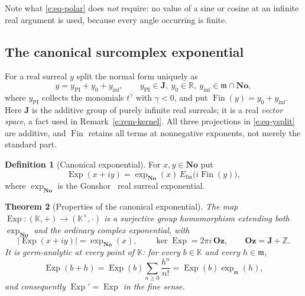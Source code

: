 \documentclass[11pt,a4paper]{article}
\numberwithin{equation}{section}
\newtheorem{theorem}{Theorem}[section]
\theoremstyle{definition}
\newtheorem{definition}[theorem]{Definition}
\theoremstyle{remark}
\theoremstyle{plain}
\newcommand{\K}{\mathbb K}
\newcommand{\No}{\mathbf{No}}
\newcommand{\Oz}{\mathbf{Oz}}
\newcommand{\Jpi}{\mathbf J}
\newcommand{\RR}{\mathbb R}
\newcommand{\ZZ}{\mathbb Z}
\newcommand{\mm}{\mathfrak m}
\DeclareMathOperator{\Exp}{Exp}
\newcommand{\tm}{t}
\newcommand{\abs}[1]{\lvert #1\rvert}
\begin{document}
Note what \eqref{e:eq-polar} does \emph{not} require: no value of a sine or
cosine at an infinite real argument is used, because every angle occurring
is finite.

\subsection{The canonical surcomplex exponential}\label{e:sec-canonicalexp}

For a real surreal $y$ split the normal form uniquely as
\begin{equation}\label{e:eq-ysplit}
 y=y_{\mathrm{PI}}+y_0+y_{\mathrm{inf}},
 \qquad y_{\mathrm{PI}}\in\Jpi,\ y_0\in\RR,\ y_{\mathrm{inf}}\in\mm\cap\No,
\end{equation}
where $y_{\mathrm{PI}}$ collects the monomials $\tm^{\gamma}$ with
$\gamma<0$, and put
$\operatorname{Fin}(y)=y_0+y_{\mathrm{inf}}$.  Here $\Jpi$ is the additive
group of purely infinite real surreals; it is a real \emph{vector space},
a fact used in Remark~\ref{e:rem-kernel}.  All three projections in
\eqref{e:eq-ysplit} are additive, and $\operatorname{Fin}$ retains all
terms at nonnegative exponents, not merely the standard part.

\begin{definition}[Canonical exponential]\label{e:def-canonicalexp}
For $x,y\in\No$ put
\begin{equation}\label{e:eq-canonicalexp}
 \Exp(x+iy)=\exp_{\No}(x)\,E_{\mathrm{fin}}\bigl(i\operatorname{Fin}(y)\bigr),
\end{equation}
where $\exp_{\No}$ is the Gonshor~\cite{Gonshor} real surreal exponential.
\end{definition}

\begin{theorem}[Properties of the canonical exponential]\label{e:thm-exp}
The map $\Exp:(\K,+)\to(\K^{\times},\cdot)$ is a surjective group
homomorphism extending both $\exp_{\No}$ and the ordinary complex
exponential, with
\begin{equation}\label{e:eq-expprops}
 \abs{\Exp(x+iy)}=\exp_{\No}(x),
 \qquad
 \ker\Exp=2\pi i\,\Oz,\qquad \Oz=\Jpi+\ZZ .
\end{equation}
It is germ-analytic at every point of $\K$: for every $b\in\K$ and every
$h\in\mm$,
\begin{equation}\label{e:eq-explocal}
 \Exp(b+h)=\Exp(b)\sum_{n\ge0}\frac{h^n}{n!}=\Exp(b)\exp_{\mm}(h),
\end{equation}
and consequently $\Exp'=\Exp$ in the fine sense.
\end{theorem}
\end{document}
